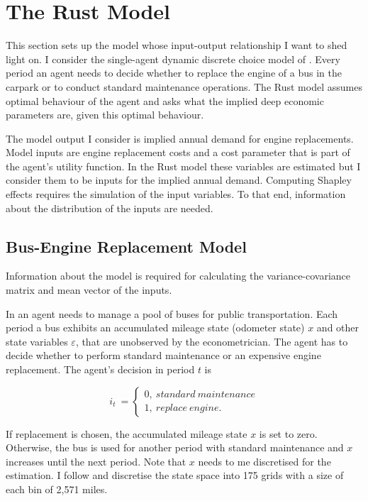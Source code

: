 \section{The Rust Model} \label{rust_model}

This section sets up the model whose input-output relationship I want to shed light on. I consider the single-agent dynamic discrete choice model of \citet{R87}. Every period an agent needs to decide whether to replace the engine of a bus in the carpark or to conduct standard maintenance operations. The Rust model assumes optimal behaviour of the agent and asks what the implied deep economic parameters are, given this optimal behaviour.

The model output I consider is implied annual demand for engine replacements. Model inputs are engine replacement costs and a cost parameter that is part of the agent’s utility function. In the Rust model these variables are estimated but I consider them to be inputs for the implied annual demand. Computing Shapley effects requires the simulation of the input variables. To that end, information about the distribution of the inputs are needed.

\subsection{Bus-Engine Replacement Model}

Information about the model is required for calculating the variance-covariance matrix and mean vector of the inputs.

In \citet{R87} an agent needs to manage a pool of buses for public transportation. Each period a bus exhibits an accumulated mileage state (odometer state) $x$ and other state variables $\varepsilon$, that are unobserved by the econometrician. The agent has to decide whether to perform standard maintenance or an expensive engine replacement. The agent’s decision in period $t$ is

\begin{equation}
i_t\ =
\begin{cases}
0,\ standard\ maintenance \\
1,\ replace\ engine.
\end{cases}
\end{equation}

If replacement is chosen, the accumulated mileage state $x$ is set to zero. Otherwise, the bus is used for another period with standard maintenance and $x$ increases until the next period. Note that $x$ needs to me discretised for the estimation. I follow \citet{R87} and discretise the state space into 175 grids with a size of each bin of 2,571 miles.

